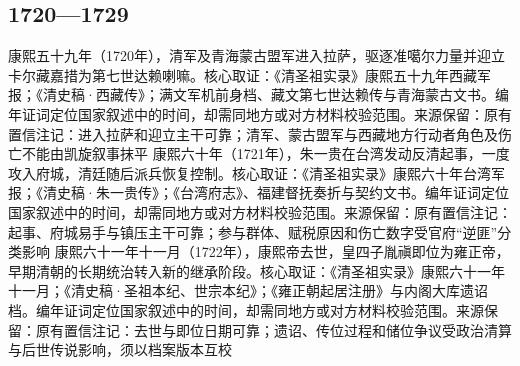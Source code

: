 \subsection{1720—1729}
康熙五十九年（1720年），清军及青海蒙古盟军进入拉萨，驱逐准噶尔力量并迎立卡尔藏嘉措为第七世达赖喇嘛。核心取证：《清圣祖实录》康熙五十九年西藏军报；《清史稿·西藏传》；满文军机前身档、藏文第七世达赖传与青海蒙古文书。编年证词定位国家叙述中的时间，却需同地方或对方材料校验范围。来源保留：原有置信注记：进入拉萨和迎立主干可靠；清军、蒙古盟军与西藏地方行动者角色及伤亡不能由凯旋叙事抹平
康熙六十年（1721年），朱一贵在台湾发动反清起事，一度攻入府城，清廷随后派兵恢复控制。核心取证：《清圣祖实录》康熙六十年台湾军报；《清史稿·朱一贵传》；《台湾府志》、福建督抚奏折与契约文书。编年证词定位国家叙述中的时间，却需同地方或对方材料校验范围。来源保留：原有置信注记：起事、府城易手与镇压主干可靠；参与群体、赋税原因和伤亡数字受官府“逆匪”分类影响
康熙六十一年十一月（1722年），康熙帝去世，皇四子胤禛即位为雍正帝，早期清朝的长期统治转入新的继承阶段。核心取证：《清圣祖实录》康熙六十一年十一月；《清史稿·圣祖本纪、世宗本纪》；《雍正朝起居注册》与内阁大库遗诏档。编年证词定位国家叙述中的时间，却需同地方或对方材料校验范围。来源保留：原有置信注记：去世与即位日期可靠；遗诏、传位过程和储位争议受政治清算与后世传说影响，须以档案版本互校
